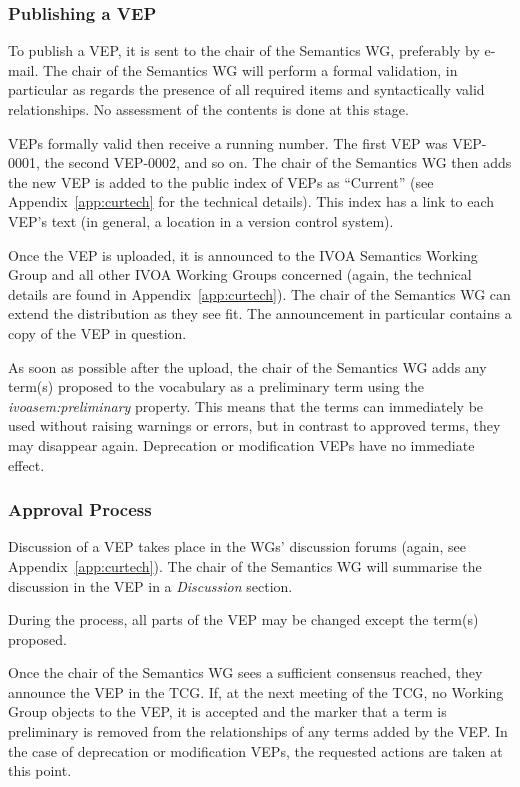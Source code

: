 \documentclass[11pt,a4paper]{ivoa}
\newcommand{\vocterm}[1]{\emph{\color{termcolor}#1}}
\begin{document}
\subsubsection{Publishing a VEP}

To publish a VEP, it is sent to the chair of the Semantics WG,
preferably by e-mail.  The chair of the Semantics WG will perform a
formal validation, in particular as regards the presence of all required
items and syntactically valid relationships.  No assessment of the
contents is done at this stage.

VEPs formally valid then receive a running number. The first VEP was
VEP-0001, the second VEP-0002, and so on.  The chair of the Semantics WG
then adds the new VEP is added to the public index of VEPs as
``Current'' (see Appendix~\ref{app:curtech} for the technical details).
This index has a link to each VEP's text (in general, a location in a
version control system).

Once the VEP is uploaded, it is announced to the IVOA Semantics Working
Group and all other IVOA Working Groups concerned (again, the technical
details are found in Appendix~\ref{app:curtech}).  The chair of the
Semantics WG can extend the distribution as they see fit.  The
announcement in particular contains a copy of the VEP in question.

As soon as possible after the upload, the chair of the Semantics WG adds
any term(s) proposed to the vocabulary as a preliminary term using the
\vocterm{ivoasem:preliminary} property.   This means that the terms can
immediately be used without raising warnings or errors, but in contrast
to approved terms, they may disappear again.  Deprecation or
modification VEPs have no immediate effect.

\subsubsection{Approval Process}
\label{sect:approval}

Discussion of a VEP takes place in the WGs' discussion forums (again,
see Appendix~\ref{app:curtech}).  The chair of the Semantics WG will
summarise the discussion in the VEP in a \textit{Discussion} section.

During the process, all parts of the VEP may be changed except the
term(s) proposed.

Once the chair of the Semantics WG sees a sufficient consensus reached,
they announce the VEP in the TCG.  If, at the next meeting of the TCG,
no Working Group objects to the VEP, it is accepted and the marker that
a term is preliminary is removed from the relationships of any terms
added by the VEP.  In the case of deprecation or modification VEPs, the
requested actions are taken at this point.
\end{document}
